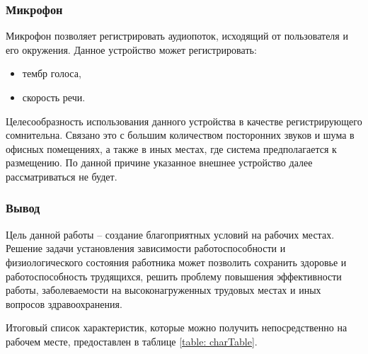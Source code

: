 \subsubsection{Микрофон}
Микрофон позволяет регистрировать аудиопоток, исходящий от пользователя и его окружения. Данное устройство может регистрировать:
\begin{itemize}
\item тембр голоса,
\item скорость речи.
\end{itemize}

Целесообразность использования данного устройства в качестве регистрирующего сомнительна. Связано это с большим количеством посторонних звуков и шума в офисных помещениях, а также в иных местах, где система предполагается к размещению. По данной причине указанное внешнее устройство далее рассматриваться не будет.

\subsubsection*{Вывод}
Цель данной работы -- создание благоприятных условий на рабочих местах. Решение задачи установления зависимости работоспособности и физиологического состояния работника может позволить сохранить здоровье и работоспособность трудящихся, решить проблему повышения эффективности работы, заболеваемости на высоконагруженных трудовых местах и иных вопросов здравоохранения.

Итоговый список характеристик, которые можно получить непосредственно на рабочем месте, предоставлен в таблице \ref{table: charTable}.


